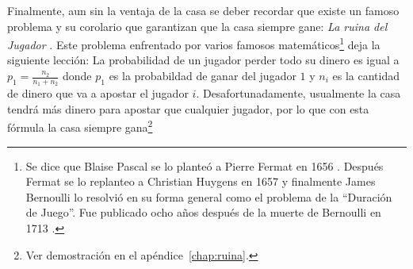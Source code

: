 \begin{table}[ht]
\centering
{}
\caption{Ventajas de la casa para juegos populares de casino \cite{hannum2005practical}}
\label{ventaja-casa}
\end{table}

Finalmente, aun sin la ventaja de la casa se deber recordar que existe un famoso problema y su corolario que garantizan que la casa siempre gane: \emph{La ruina del Jugador} \cite[p.~95-99]{ross2006first}. Este problema enfrentado por varios famosos matemáticos\footnote{Se dice que Blaise Pascal se lo planteó a Pierre Fermat en 1656 \cite{edwards1983pascal}. Después Fermat se lo replanteo a Christian Huygens en 1657 y finalmente James Bernoulli lo resolvió en su forma general como el problema de la ``Duración de Juego''. Fue publicado ocho años después de la muerte de Bernoulli en 1713 \cite[p.~98]{ross2006first}.} deja la siguiente lección: La probabilidad de un jugador perder todo su dinero es igual a  $p_1 = \frac{n_2}{n_1 + n_2}$ donde $p_1$ es la probabildad de ganar del jugador $1$ y $n_i$ es la cantidad de dinero que va a apostar el jugador $i$. Desafortunadamente, usualmente la casa tendrá más dinero para apostar que cualquier jugador, por lo que con esta fórmula la casa siempre gana\footnote{Ver demostración en el apéndice~\ref{chap:ruina}.}


